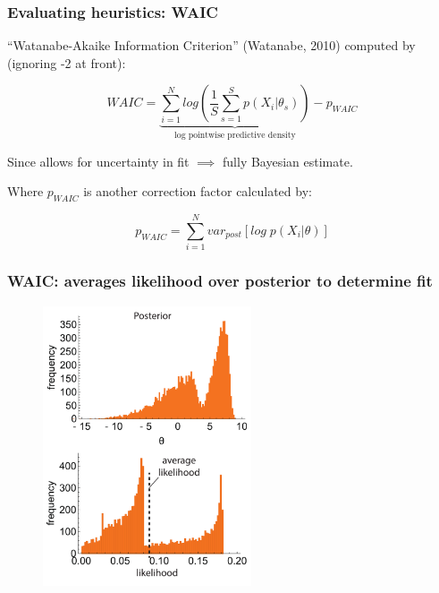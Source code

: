 \documentclass[handout]{beamer}
\begin{document}
\begin{frame}
	\frametitle{Evaluating heuristics: WAIC}
	 ``Watanabe-Akaike Information Criterion'' (Watanabe, 2010) computed by (ignoring -2 at front):
	
	\begin{equation}
	WAIC = \underbrace{\sum_{i=1}^{N} log\left(\frac{1}{S}\sum_{s=1}^{S} p(X_i|\theta_s)\right)}_{\text{log pointwise predictive density}} - p_{WAIC}
	\end{equation}
	
	 Since allows for uncertainty in fit $\implies$ fully Bayesian estimate.
	
	 Where $p_{WAIC}$ is another correction factor calculated by:
	
	\begin{equation}
	p_{WAIC} = \sum_{i=1}^{N} var_{post} \left[log\; p(X_i|\theta)\right]
	\end{equation}
	
\end{frame}

\begin{frame}
	\frametitle{WAIC: averages likelihood over posterior to determine fit}
	
	\begin{figure}[ht]
		\centerline{\includegraphics[width=0.55\textwidth]{figures/lec7_likelihood2.pdf}}
	\end{figure}
	
\end{frame}
\end{document}

